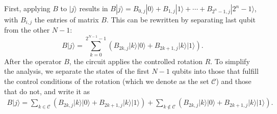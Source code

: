 \documentclass[10pt,letterpaper]{article} %
\providecommand{\DIFaddtex}[1]{{\protect\color{blue}\uwave{#1}}} %
\providecommand{\DIFdeltex}[1]{{\protect\color{red}\sout{#1}}}                      %
\providecommand{\DIFaddbegin}{} %
\providecommand{\DIFaddend}{} %
\providecommand{\DIFdelbegin}{} %
\providecommand{\DIFdelend}{} %
\providecommand{\DIFadd}[1]{\texorpdfstring{\DIFaddtex{#1}}{#1}} %
\providecommand{\DIFdel}[1]{\texorpdfstring{\DIFdeltex{#1}}{}} %
\newcommand{\DIFscaledelfig}{0.5}
\newlength{\DIFdelgraphicswidth} %
\newlength{\DIFdelgraphicsheight} %
\newcommand{\DIFaddincludegraphics}[2][]{{\color{blue}\fbox{\DIFOincludegraphics[#1]{#2}}}} %
\newcommand{\DIFdelincludegraphics}[2][]{%
\sbox{\DIFdelgraphicsbox}{\DIFOincludegraphics[#1]{#2}}%
\settoboxwidth{\DIFdelgraphicswidth}{\DIFdelgraphicsbox} %
\settoboxtotalheight{\DIFdelgraphicsheight}{\DIFdelgraphicsbox} %
\scalebox{\DIFscaledelfig}{%
\parbox[b]{\DIFdelgraphicswidth}{\usebox{\DIFdelgraphicsbox}\\[-\baselineskip] \rule{\DIFdelgraphicswidth}{0em}}\llap{\resizebox{\DIFdelgraphicswidth}{\DIFdelgraphicsheight}{%
\setlength{\unitlength}{\DIFdelgraphicswidth}%
\begin{picture}(1,1)%
\thicklines\linethickness{2pt} %
{\color[rgb]{1,0,0}\put(0,0){\framebox(1,1){}}}%
{\color[rgb]{1,0,0}\put(0,0){\line( 1,1){1}}}%
{\color[rgb]{1,0,0}\put(0,1){\line(1,-1){1}}}%
\end{picture}%
}\hspace*{3pt}}} %
} %
\DeclareRobustCommand{\DIFaddbegin}{\DIFOaddbegin \let\includegraphics\DIFaddincludegraphics} %
\DeclareRobustCommand{\DIFaddend}{\DIFOaddend \let\includegraphics\DIFOincludegraphics} %
\DeclareRobustCommand{\DIFdelbegin}{\DIFOdelbegin \let\includegraphics\DIFdelincludegraphics} %
\DeclareRobustCommand{\DIFdelend}{\DIFOaddend \let\includegraphics\DIFOincludegraphics} %
\begin{document}
First, applying $B$ to $|j\rangle$ results in $B|j\rangle = B_{0,j} |0\rangle + B_{1,j} |1 \rangle + \cdots + B_{2^n-1,j}|2^n-1\rangle$,
with $B_{i,j}$ the entries of matrix $B$.
This can be rewritten by separating \DIFaddbegin \DIFadd{the }\DIFaddend last qubit from the other $N-1$:
\begin{equation}
B|j\rangle = \sum_{k=0}^{2^{N-1}-1} \left( B_{2k,j} |k\rangle|0\rangle  + B_{2k+1,j} |k \rangle |1\rangle  \right).
\end{equation}
After the operator $B$, the circuit applies the  controlled rotation \DIFdelbegin \DIFdel{$R$}\DIFdelend \DIFaddbegin \DIFadd{$R_{\sigma_3}(2s(p))$}\DIFaddend .
To simplify the analysis, we separate the states of
the first $N-1$ qubits into those that fulfill the control conditions of the rotation
(which we denote as the set $\mathcal{C}$)
and those that do not, and write it as
\begin{align}
B|j\rangle = 
   \sum_{k \in \mathcal{C}} \left( B_{2k,j} |k\rangle|0\rangle 
                                     + B_{2k+1,j} |k \rangle |1\rangle  \right) 
   + \sum_{k \not\in \mathcal{C}} \left( B_{2k,j} |k\rangle|0\rangle  
                                      + B_{2k+1,j} |k \rangle |1\rangle  \right).
\end{align}
\end{document}
